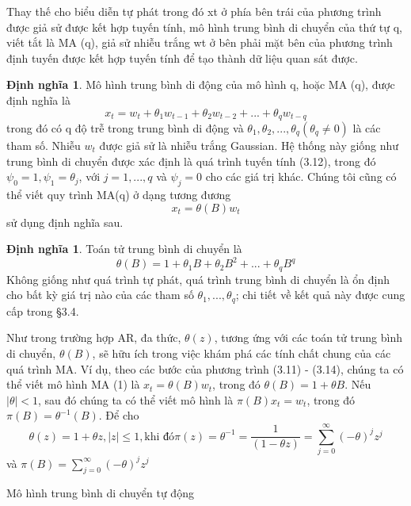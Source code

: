 \documentclass[12pt, a4paper,oneside]{book}
\theoremstyle{definition}
\newtheorem{dn}[theo]{Định nghĩa}
\begin{document}
Thay thế cho biểu diễn tự phát trong đó xt ở phía bên trái của phương trình được giả sử được kết hợp tuyến tính, mô hình trung bình di chuyển của thứ tự q, viết tắt là MA (q), giả sử nhiễu trắng wt ở bên phải mặt bên của phương trình định tuyến được kết hợp tuyến tính để tạo thành dữ liệu quan sát được.
\begin{dn}
	Mô hình trung bình di động của mô hình q, hoặc MA (q), được định nghĩa là 
	$$x_{t}= w_{t}+\theta_{1}w_{t-1}+ \theta_{2}w_{t-2}+...+\theta_{q}w_{t-q}$$
	trong đó có q độ trễ trong trung bình di động và $\theta_{1}, \theta_{2}, ..., \theta_{q} (\theta_{q} \neq 0)$ là các tham số. Nhiễu $w_{t}$ được giả sử là nhiễu trắng Gaussian.
	Hệ thống này giống như trung bình di chuyển được xác định là quá trình tuyến tính (3.12), trong đó $\psi_{0} = 1, \psi_{1} = \theta_{j}$, với $j = 1, ..., q$ và $ \psi_{j} = 0$ cho các giá trị khác. Chúng tôi cũng có thể viết quy trình MA(q) ở dạng tương đương
	$$x_{t}= \theta(B)w_{t}$$
	sử dụng định nghĩa sau.
\end{dn}
\begin{dn}
	Toán tử trung bình di chuyển là 
	$$\theta(B)= 1+ \theta_{1}B+\theta_{2}B^{2}+...+ \theta_{q}B^{q}$$
	Không giống như quá trình tự phát, quá trình trung bình di chuyển là ổn định cho bất kỳ giá trị nào của các tham số $\theta_{1}, ..., \theta_{q}$; chi tiết về kết quả này được cung cấp trong §3.4.
	
	Như trong trường hợp AR, đa thức, $\theta(z)$, tương ứng với các toán tử trung bình di chuyển, $\theta(B)$, sẽ hữu ích trong việc khám phá các tính chất chung của các quá trình MA. Ví dụ, theo các bước của phương trình (3.11) - (3.14), chúng ta có thể viết mô hình MA (1) là $x_{t} = \theta(B) w_{t}$, trong đó $\theta(B) = 1 + \theta B$. Nếu $| \theta | <1$, sau đó chúng ta có thể viết mô hình là $\pi (B)x_{t} = w_{t}$, trong đó $\pi(B) = \theta^{-1}(B)$. Để cho 
	$$\theta(z) = 1+\theta z, |z|\leq1, \text{khi đó}  \pi(z)= \theta^{-1} = \dfrac{1}{(1-\theta z)}= \sum_{j=0}^{\infty}(-\theta)^{j}z^{j}$$
	và $\pi(B)= \sum_{j=0}^{\infty}(-\theta)^{j}z^{j}$
\end{dn}
Mô hình trung bình di chuyển tự động
\end{document}
